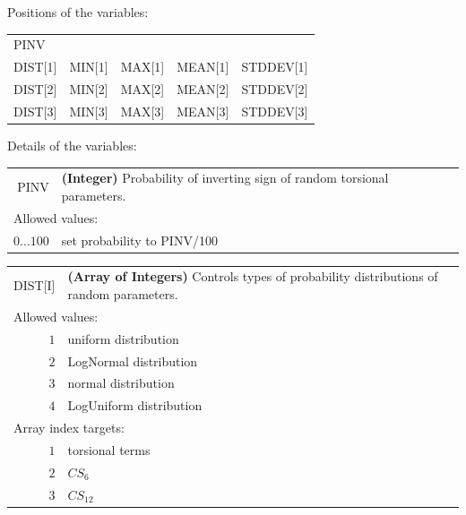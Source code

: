 \documentclass[10pt,a4paper,openany]{memoir}
\numberwithin{equation}{section}
\begin{document}
Positions of the variables:
\begin{center}
  \begin{tabular}{lllll}
    PINV&&&& \\
    DIST[1]&MIN[1]&MAX[1]&MEAN[1]&STDDEV[1] \\
    DIST[2]&MIN[2]&MAX[2]&MEAN[2]&STDDEV[2] \\
    DIST[3]&MIN[3]&MAX[3]&MEAN[3]&STDDEV[3] \\
  \end{tabular}
\end{center}

\noindent Details of the variables:
\vspace{2ex}

{
\begin{tabular}{r@{ : }l}
\label{descr:pinv}
      PINV&\textbf{(Integer)} Probability of inverting sign of random torsional parameters.                             \\ 
\multicolumn{2}{l}{Allowed values:} \\ 
    \(0 \ldots 100 \)&set probability to PINV/100                                                                          \\ 
\end{tabular}
\vspace{1ex}
}

{
\begin{tabular}{r@{ : }l}
\label{descr:dist}
      DIST[I]&\textbf{(Array of Integers)} Controls types of probability distributions of random parameters.                                      \\ 
\multicolumn{2}{l}{Allowed values:} \\ 
     \(1\)&uniform distribution                                                                                 \\ 
\(2\)&LogNormal distribution                                                                                  \\ 
\(3\)&normal distribution                                                                              \\ 
\(4\)&LogUniform distribution                                                                              \\ 
\multicolumn{2}{l}{Array index targets:} \\ 
     \(1\)&torsional terms                                                                                      \\ 
     \(2\)&$CS_6$                                                                                               \\ 
     \(3\)&$CS_{12}$                                                                                            \\ 
\end{tabular}
\vspace{1ex}
}
\end{document}
